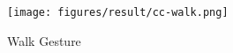 \begin{figure}
	[h] \centering 
	\texttt{[image: figures/result/cc-walk.png]} \caption{Walk Gesture} \label{fg:cc:walk} 
\end{figure}

